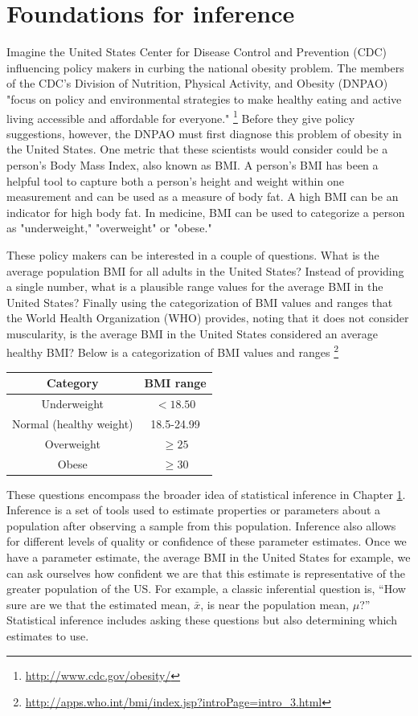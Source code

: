 \chapter{Foundations for inference} 
\label{foundationsForInference}

Imagine the United States Center for Disease Control and Prevention (CDC) influencing policy makers in curbing the national obesity problem. The members of the CDC's Division of Nutrition, Physical Activity, and Obesity (DNPAO) "focus on policy and environmental strategies to make healthy eating and active living accessible and affordable for everyone." \footnote{\url{http://www.cdc.gov/obesity/}} Before they give policy suggestions, however, the DNPAO must first diagnose this problem of obesity in the United States. One metric that these scientists would consider could be a person's Body Mass Index, also known as BMI. A person's BMI has been a helpful tool to capture both a person's height and weight within one measurement and can be used as a measure of body fat. A high BMI can be an indicator for high body fat. In medicine, BMI can be used to categorize a person as "underweight," "overweight" or "obese." 

These policy makers can be interested in a couple of questions. What is the average population BMI for all adults in the United States? Instead of providing a single number, what is a plausible range values for the average BMI in the United States? Finally using the categorization of BMI values and ranges that the World Health Organization (WHO) provides, noting that it does not consider muscularity, is the average BMI in the United States considered an average healthy BMI? Below is a categorization of BMI values and ranges
\footnote{\url{http://apps.who.int/bmi/index.jsp?introPage=intro_3.html}}

\begin{center}
\begin{tabular}{|c|c|}
\hline 
Category & BMI range\tabularnewline
\hline 
\hline 
Underweight & $<18.50$\tabularnewline
\hline 
Normal (healthy weight) & 18.5-24.99\tabularnewline
\hline 
Overweight & $\geq 25$\tabularnewline
\hline 
Obese & $\geq30$\tabularnewline
\hline 
\end{tabular}
\end{center}

These questions encompass the broader idea of statistical inference in Chapter \ref{foundationsForInference}. Inference is a set of tools used to estimate properties or parameters about a population after observing a sample from this population. Inference also allows for different levels of quality or confidence of these parameter estimates. Once we have a parameter estimate, the average BMI in the United States for example, we can ask ourselves how confident we are that this estimate is representative of the greater population of the US. For example, a classic inferential question is, ``How sure are we that the estimated mean, $\bar{x}$, is near the population mean, $\mu$?'' Statistical inference includes asking these questions but also determining which estimates to use.

